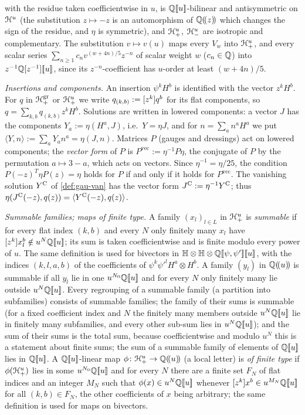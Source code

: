 \begin{conv}
\begin{description}
\[\]
with the residue taken coefficientwise in $u$, is $\mathbb{Q}[\![ u ]\!]$-bilinear and antisymmetric on $\mathcal{H}^u$ (the substitution $z\mapsto -z$ is an automorphism of $\mathbb{Q}(\!(z)\!)$ which changes the sign of the residue, and $\eta$ is symmetric), and $\mathcal{H}^u_+$, $\mathcal{H}^u_-$ are isotropic and complementary. The substitution $v\mapsto v(u)$ maps every $V_w$ into $\mathcal{H}^u_+$, and every scalar series $\sum_{n\geq 1}c_nv^{(w+4n)/5}z^{-n}$ of scalar weight $w$ ($c_n\in\mathbb{Q}$) into $z^{-1}\mathbb{Q}[z^{-1}][\![ u ]\!]$, since its $z^{-n}$-coefficient has $u$-order at least $(w+4n)/5$.
\end{description}
\emph{Insertions and components.} An insertion $\psi^kH^b$ is identified with the vector $z^kH^b$. For $q$ in $\mathcal{H}^{\mathrm{gr}}_+$ or $\mathcal{H}^u_+$ we write $q_{(k,b)} := [z^k]q^b$ for its flat components, so $q = \sum_{k,b}q_{(k,b)}z^kH^b$. Solutions are written in lowered components: a vector $J$ has the components $Y_a := \eta(H^a,J)$, i.e.\ $Y = \eta J$, and for $n = \sum_an^aH^a$ we put $\langle Y,n\rangle := \sum_aY_an^a = \eta(J,n)$. Matrices $P$ (gauges and dressings) act on lowered components; the \emph{vector form} of $P$ is $P^{\mathrm{vec}} := \eta^{-1}P\eta$, the conjugate of $P$ by the permutation $a\mapsto 3-a$, which acts on vectors. Since $\eta^{-1} = \eta/25$, the condition $P(-z)^T\eta P(z) = \eta$ holds for $P$ if and only if it holds for $P^{\mathrm{vec}}$. The vanishing solution $Y^{\mathrm{C}}$ of \cref{def:gau-van} has the vector form $J^{\mathrm C} := \eta^{-1}Y^{\mathrm{C}}$; thus $\eta(J^{\mathrm C}(-z),q(z)) = \langle Y^{\mathrm{C}}(-z),q(z)\rangle$.

\emph{Summable families; maps of finite type.} A family $(x_l)_{l\in L}$ in $\mathcal{H}^u_+$ is \emph{summable} if for every flat index $(k,b)$ and every $N$ only finitely many $x_l$ have $[z^k]x_l^b\notin u^N\mathbb{Q}[\![ u ]\!]$; its sum is taken coefficientwise and is finite modulo every power of $u$. The same definition is used for bivectors in $\mathbb{H}\otimes\mathbb{H}\otimes\mathbb{Q}[\![ \psi,\psi' ]\!][\![ u ]\!]$, with the indices $(k,l,a,b)$ of the coefficients of $\psi^k\psi'^lH^a\otimes H^b$. A family $(y_l)$ in $\mathbb{Q}(\!(u)\!)$ is summable if all $y_l$ lie in one $u^{N_0}\mathbb{Q}[\![ u ]\!]$ and for every $N$ only finitely many lie outside $u^N\mathbb{Q}[\![ u ]\!]$. Every regrouping of a summable family (a partition into subfamilies) consists of summable families; the family of their sums is summable (for a fixed coefficient index and $N$ the finitely many members outside $u^N\mathbb{Q}[\![ u ]\!]$ lie in finitely many subfamilies, and every other sub-sum lies in $u^N\mathbb{Q}[\![ u ]\!]$); and the sum of their sums is the total sum, because coefficientwise and modulo $u^N$ this is a statement about finite sums; the sum of a summable family of elements of $\mathbb{Q}[\![ u ]\!]$ lies in $\mathbb{Q}[\![ u ]\!]$. A $\mathbb{Q}[\![ u ]\!]$-linear map $\phi\colon\mathcal{H}^u_+\to\mathbb{Q}(\!(u)\!)$ (a local letter) is \emph{of finite type} if $\phi(\mathcal{H}^u_+)$ lies in some $u^{N_0}\mathbb{Q}[\![ u ]\!]$ and for every $N$ there are a finite set $F_N$ of flat indices and an integer $M_N$ such that $\phi(x)\in u^N\mathbb{Q}[\![ u ]\!]$ whenever $[z^k]x^b\in u^{M_N}\mathbb{Q}[\![ u ]\!]$ for all $(k,b)\in F_N$, the other coefficients of $x$ being arbitrary; the same definition is used for maps on bivectors.
\end{conv}

